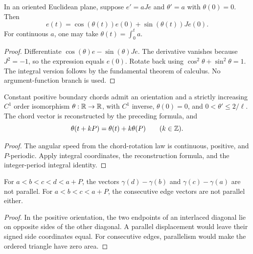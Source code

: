 \begin{lemma}
\label{lem:rotation-reconstruction}
\leanok
In an oriented Euclidean plane, suppose $e'=aJe$ and $\theta'=a$ with
$\theta(0)=0$. Then
\[
 e(t)=\cos(\theta(t))e(0)+\sin(\theta(t))Je(0).
\]
For continuous $a$, one may take $\theta(t)=\int_0^t a$.
\end{lemma}
\begin{proof}
\leanok
Differentiate $\cos(\theta)e-\sin(\theta)Je$. The derivative vanishes
because $J^2=-1$, so the expression equals $e(0)$. Rotate back using
$\cos^2\theta+\sin^2\theta=1$. The integral version follows by the
fundamental theorem of calculus. No argument-function branch is used.
\end{proof}

\begin{proposition}
\label{prop:global-chord-angle}
\leanok
{}
Constant positive boundary chords admit an orientation and a strictly
increasing $C^1$ order isomorphism $\theta:\mathbb{R}\to\mathbb{R}$, with $C^1$ inverse,
$\theta(0)=0$, and $0<\theta'\leq2/\ell$. The chord vector is reconstructed
by the preceding formula, and
\[
 \theta(t+kP)=\theta(t)+k\theta(P)\qquad(k\in\mathbb{Z}).
\]
\end{proposition}
\begin{proof}
\leanok
The angular speed from the chord-rotation law is continuous, positive,
and $P$-periodic. Apply integral coordinates, the reconstruction formula,
and the integer-period integral identity.
\end{proof}

\begin{lemma}
\label{lem:nonparallel-chords}
\leanok
{}
For $a<b<c<d<a+P$, the vectors $\gamma(d)-\gamma(b)$ and
$\gamma(c)-\gamma(a)$ are not parallel. For $a<b<c<a+P$, the consecutive
edge vectors are not parallel either.
\end{lemma}
\begin{proof}
\leanok
In the positive orientation, the two endpoints of an interlaced diagonal
lie on opposite sides of the other diagonal. A parallel displacement
would leave their signed side coordinates equal. For consecutive edges,
parallelism would make the ordered triangle have zero area.
\end{proof}

